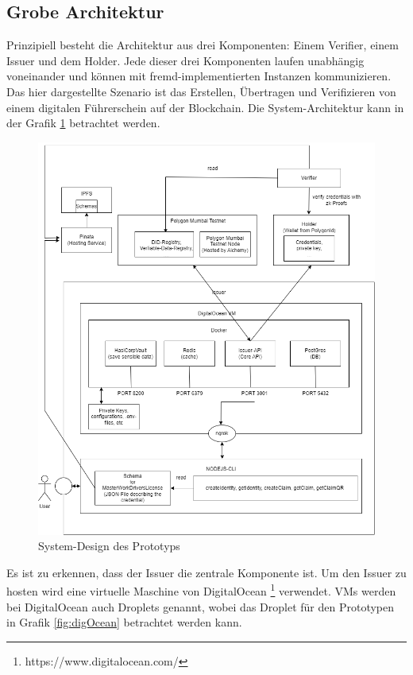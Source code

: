 \subsection{Grobe Architektur}
Prinzipiell besteht die Architektur aus drei Komponenten: Einem Verifier, einem Issuer und dem Holder. Jede dieser drei Komponenten laufen unabhängig voneinander und können mit fremd-implementierten Instanzen kommunizieren. Das hier dargestellte Szenario ist das Erstellen, Übertragen und Verifizieren von einem digitalen Führerschein auf der Blockchain. Die System-Architektur kann in der Grafik \ref{fig:design} betrachtet werden.
\begin{figure}[H]
	\centering
	\includegraphics[scale=0.4]{media/system-design}
	\caption{System-Design des Prototyps}
	\label{fig:design}
\end{figure}
Es ist zu erkennen, dass der Issuer die zentrale Komponente ist. Um den Issuer zu hosten wird eine virtuelle Maschine von DigitalOcean \footnote{https://www.digitalocean.com/} verwendet. VMs werden bei DigitalOcean auch Droplets genannt, wobei das Droplet für den Prototypen in Grafik \ref{fig:digOcean} betrachtet werden kann.

